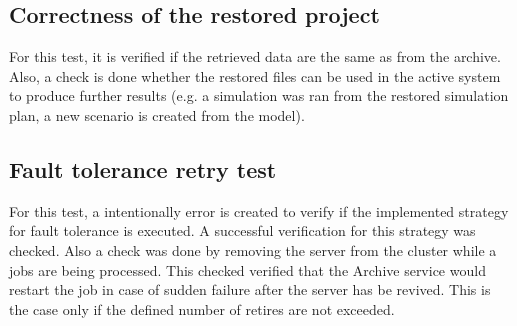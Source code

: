 \subsection{Correctness of the restored project}
For this test, it is verified if the retrieved data are the same as from the archive. Also, a check is done whether the restored files can be used in the active system
to produce further results (e.g. a simulation was ran from the restored simulation plan, a new scenario is created from the model).

\subsection{Fault tolerance retry test}
For this test, a intentionally error is created to verify if the implemented strategy for fault tolerance is executed. A successful verification for this
strategy was checked. Also a check was done by removing the server from the cluster while a jobs are being processed. This checked verified that the Archive service
would restart the job in case of sudden failure after the server has be revived. This is the case only if the defined number of retires are not exceeded.